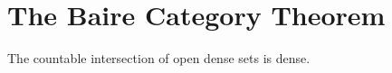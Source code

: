 \section{The Baire Category Theorem}

\begin{theorem}
    The countable intersection of open dense sets is dense.  
\end{theorem}